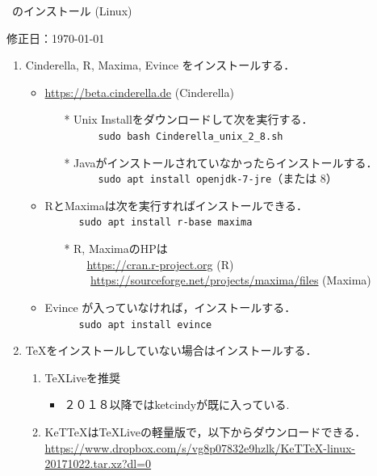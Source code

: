 \documentclass{ujarticle}
\begin{document}
\begin{center}
\ketcindy\ のインストール (Linux)
\end{center}

\hfill 修正日：\today

\begin{enumerate}[\bf\large 1.]
\item Cinderella, R, Maxima, Evince をインストールする．
 \begin{itemize}
 \item \url{https://beta.cinderella.de}  (Cinderella)
    \begin{itemize}
    \item[*]Unix Installをダウンロードして次を実行する．\\
　　　\verb|sudo bash Cinderella_unix_2_8.sh|
    \item[*]Javaがインストールされていなかったらインストールする．\\
　　　\verb|sudo apt install openjdk-7-jre|（または 8）
    \end{itemize}
    \item RとMaximaは次を実行すればインストールできる．\\
　　　\verb|sudo apt install r-base maxima|
    \begin{itemize}
    \item[*]R, MaximaのHPは\\
 　　\url{https://cran.r-project.org}   (R)\\
　　 \url{https://sourceforge.net/projects/maxima/files}  (Maxima)
    \end{itemize}
 \item Evince が入っていなければ，インストールする．\\
　　　\verb|sudo apt install evince|
 \end{itemize}

\item \TeX をインストールしていない場合はインストールする．
 \begin{enumerate}[(1)]
 \item TeXLiveを推奨
    \begin{itemize}
    \item ２０１８以降ではketcindyが既に入っている.
    \end{itemize}
\item KeTTeXはTeXLiveの軽量版で，以下からダウンロードできる．\\
    \hspace*{6mm}\url{https://www.dropbox.com/s/vg8p07832e9hzlk/KeTTeX-linux-20171022.tar.xz?dl=0}
 \end{enumerate}


\end{enumerate}
\end{document}
